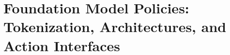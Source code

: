 \chapter{Foundation Model Policies: Tokenization, Architectures, and Action Interfaces}
\label{ch:C03}










